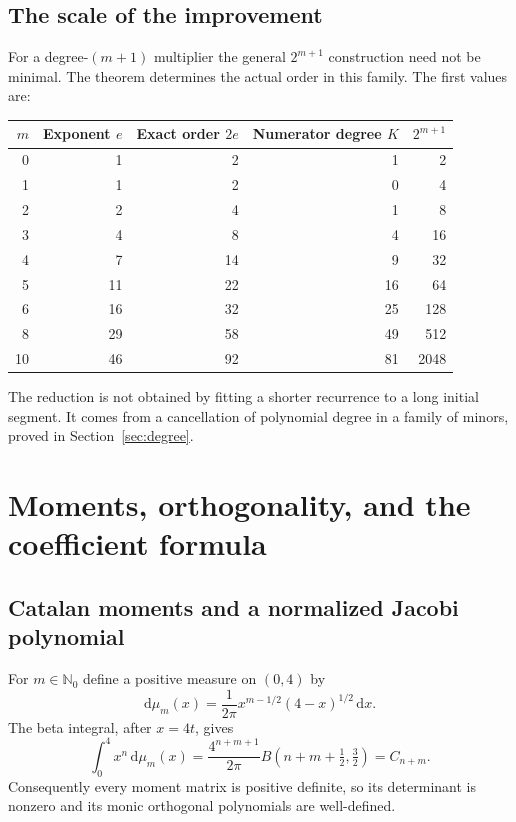 \documentclass[11pt,a4paper]{article}
\numberwithin{equation}{section}
\theoremstyle{definition}
\theoremstyle{remark}
\newcommand{\NN}{\mathbb N_0}
\newcommand{\dd}{\mathrm d}
\begin{document}
\subsection{The scale of the improvement}
For a degree-$(m+1)$ multiplier the general $2^{m+1}$ construction need
not be minimal.  The theorem determines the actual order in this family.
The first values are:
\begin{center}
\renewcommand{\arraystretch}{1.12}
\begin{tabular}{@{}rrrrr@{}}
\toprule
$m$ & Exponent $e$ & Exact order $2e$ & Numerator degree $K$ & $2^{m+1}$\\
\midrule
0 & 1 & 2 & 1 & 2\\
1 & 1 & 2 & 0 & 4\\
2 & 2 & 4 & 1 & 8\\
3 & 4 & 8 & 4 & 16\\
4 & 7 & 14 & 9 & 32\\
5 & 11 & 22 & 16 & 64\\
6 & 16 & 32 & 25 & 128\\
8 & 29 & 58 & 49 & 512\\
10 & 46 & 92 & 81 & 2048\\
\bottomrule
\end{tabular}
\end{center}
The reduction is not obtained by fitting a shorter recurrence to a long
initial segment.  It comes from a cancellation of polynomial degree in a
family of minors, proved in Section~\ref{sec:degree}.

\section{Moments, orthogonality, and the coefficient formula}\label{sec:coeffproof}

\subsection{Catalan moments and a normalized Jacobi polynomial}
For $m\in\NN$ define a positive measure on $(0,4)$ by
\begin{equation}\label{eq:measure}
 \dd\mu_m(x)=\frac1{2\pi}x^{m-1/2}(4-x)^{1/2}\,\dd x.
\end{equation}
The beta integral, after $x=4t$, gives
\begin{equation}\label{eq:moments}
 \int_0^4 x^n\,\dd\mu_m(x)
 =\frac{4^{n+m+1}}{2\pi}B(n+m+\tfrac12,\tfrac32)
 =C_{n+m}.
\end{equation}
Consequently every moment matrix is positive definite, so its determinant
is nonzero and its monic orthogonal polynomials are well-defined.
\end{document}
